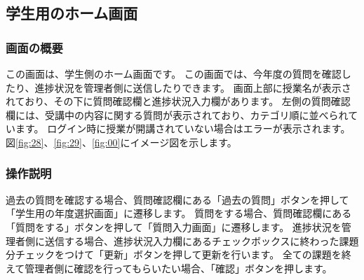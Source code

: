 \newpage

\subsection{学生用のホーム画面}
\subsubsection{画面の概要}
この画面は、学生側のホーム画面です。
この画面では、今年度の質問を確認したり、進捗状況を管理者側に送信したりできます。
画面上部に授業名が表示されており、その下に質問確認欄と進捗状況入力欄があります。
左側の質問確認欄には、受講中の内容に関する質問が表示されており、カテゴリ順に並べられています。
ログイン時に授業が開講されていない場合はエラーが表示されます。
図\ref{fig:28}、\ref{fig:29}、\ref{fig:00}にイメージ図を示します。

\subsubsection{操作説明}
過去の質問を確認する場合、質問確認欄にある「過去の質問」ボタンを押して「学生用の年度選択画面」に遷移します。
質問をする場合、質問確認欄にある「質問をする」ボタンを押して「質問入力画面」に遷移します。
進捗状況を管理者側に送信する場合、進捗状況入力欄にあるチェックボックスに終わった課題分チェックをつけて「更新」ボタンを押して更新を行います。
全ての課題を終えて管理者側に確認を行ってもらいたい場合、「確認」ボタンを押します。



